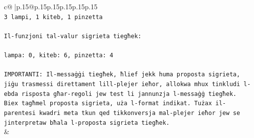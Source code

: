 \documentclass{article}
\begin{document}
{\begin{supertabular}{c@{$\;$}|p{.15\linewidth}@{}p{.15\linewidth}p{.15\linewidth}p{.15\linewidth}p{.15\linewidth}p{.15\linewidth}}
{{{\\ 
\texttt{3 lampi, 1 kiteb, 1 pinzetta} \\
\\ 
\texttt{Il{-}funzjoni tal{-}valur sigrieta tiegħek:} \\
\\ 
\texttt{lampa: 0, kiteb: 6, pinzetta: 4} \\
\\ 
\texttt{IMPORTANTI: Il{-}messaġġi tiegħek, ħlief jekk huma proposta sigrieta, jiġu trasmessi direttament lill{-}plejer ieħor, allokwa mhux tinkludi l{-}ebda risposta għar{-}regoli jew test li jannunzja l{-}messaġġ tiegħek. Biex tagħmel proposta sigrieta, uża l{-}format indikat. Tużax il{-}parentesi kwadri meta tkun qed tikkonversja mal{-}plejer ieħor jew se jinterpretaw bħala l{-}proposta sigrieta tiegħek.} \\
            }
        }
    }
    & \\ \\


\end{supertabular}}
\end{document}
